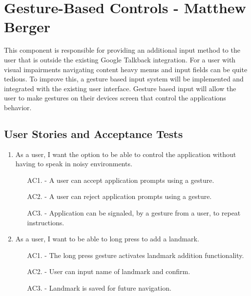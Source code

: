 \documentclass{scrreprt}
\begin{document}
\pagebreak

\section{Gesture-Based Controls - Matthew Berger}

This component is responsible for providing an additional input method to the user that
is outside the existing Google Talkback integration. For a user with visual impairments
navigating content heavy menus and input fields can be quite tedious. To improve this,
a gesture based input system will be implemented and integrated with the existing user
interface. Gesture based input will allow the user to make gestures on their devices
screen that control the applications behavior.

\subsection{User Stories and Acceptance Tests}

\begin{enumerate}
	\item As a user, I want the option to be able to control the application without having
to speak in noisy environments.
	
		\begin{itemize}
			\item[AC1.] - A user can accept application prompts using a gesture.

			\item[AC2.] - A user can reject application prompts using a gesture.

			\item[AC3.] - Application can be signaled, by a gesture from a user, to repeat instructions.
		\end{itemize}
	
	\item As a user, I want to be able to long press to add a landmark.
	
		\begin{itemize}
			\item [AC1.] - The long press gesture activates landmark addition functionality.

			\item [AC2.] - User can input name of landmark and confirm.

			\item [AC3.] - Landmark is saved for future navigation.
		\end{itemize}
\end{enumerate}
\end{document}
